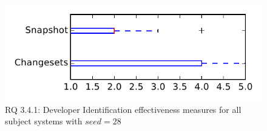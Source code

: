
\begin{figure}
\centering
\includegraphics[height=0.4\textheight]{figures/dit_seed/rq1_tiny_28}
\caption{RQ 3.4.1: Developer Identification effectiveness measures for all subject systems with $seed=28$}
\label{fig:dit_seed:rq1:tiny}
\end{figure}
